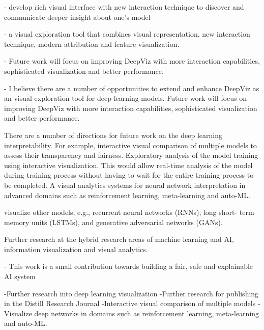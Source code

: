 - develop rich visual interface with new interaction technique to discover and communicate deeper insight about one's model

- a visual exploration tool that combines visual representation, new interaction technique, modern attribution and feature visualization.

- Future work will focus on improving DeepViz with more interaction capabilities, sophisticated visualization and better performance.

- I believe there are a number of opportunities to extend and enhance DeepViz as an visual exploration tool for deep learning models. Future work will focus on improving DeepViz with more interaction capabilities, sophisticated visualization and better performance.

There are a number of directions for future work on the deep learning interpretability. For example, interactive visual comparison of multiple models to assess their transparency and fairness. Exploratory analysis of the model training using interactive visualization. This would allow real-time analysis of the model during training process without having to wait for the entire training process to be completed. A visual analytics systems for neural network interpretation in advanced domains such as reinforcement learning, meta-learning and auto-ML.

visualize other models, e.g., recurrent neural networks (RNNs), long short- term memory units (LSTMs), and generative adversarial networks (GANs).

Further research at the hybrid research areas of machine learning and AI, information visualization and visual analytics.

- This work is a small contribution towards building a fair, safe and explainable AI system

-Further research into deep learning visualization
-Further research for publishing in the Distill Research Journal
-Interactive visual comparison of multiple models 
-Visualize deep networks in domains such as reinforcement learning, meta-learning and auto-ML.
\fi %